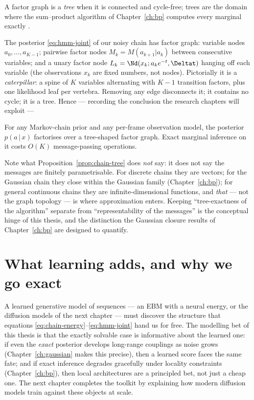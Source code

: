 A factor graph is a \emph{tree} when it is connected and cycle-free; trees
are the domain where the sum--product algorithm of Chapter~\ref{ch:bp}
computes every marginal exactly \citep{pearl1988probabilistic,
mezard2009information, bishop2006pattern}.

The posterior \eqref{eq:hmm-joint} of our noisy chain has factor graph:
variable nodes $a_0, \dots, a_{K-1}$; pairwise factor nodes
$M_k = M(a_{k+1}|a_k)$ between consecutive variables; and a unary factor
node $L_k = \Nd(x_k; a_k e^{-t}, \Deltat)$ hanging off each variable (the
observations $x_k$ are fixed numbers, not nodes). Pictorially it is a
\emph{caterpillar}: a spine of $K$ variables alternating with $K-1$
transition factors, plus one likelihood leaf per vertebra. Removing any edge
disconnects it; it contains no cycle; it is a tree. Hence --- recording the
conclusion the research chapters will exploit ---

\begin{proposition}\label{prop:chain-tree}
For any Markov-chain prior and any per-frame observation model, the
posterior $p(a \,|\, x)$ factorises over a tree-shaped factor graph.
Exact marginal inference on it costs $O(K)$ message-passing operations.
\end{proposition}

Note what Proposition~\ref{prop:chain-tree} does \emph{not} say: it does not
say the messages are finitely parametrisable. For discrete chains they are
vectors; for the Gaussian chain they close within the Gaussian family
(Chapter~\ref{ch:bp}); for general continuous chains they are
infinite-dimensional functions, and \emph{that} --- not the graph topology
--- is where approximation enters. Keeping ``tree-exactness of the
algorithm'' separate from ``representability of the messages'' is the
conceptual hinge of this thesis, and the distinction the Gaussian closure
results of Chapter~\ref{ch:bp} are designed to quantify.

\section{What learning adds, and why we go exact}\label{sec:ebm-learning}

A learned generative model of sequences --- an EBM with a neural energy, or
the diffusion models of the next chapter --- must discover the structure
that equations \eqref{eq:chain-energy}--\eqref{eq:hmm-joint} hand us for
free. The modelling bet of this thesis is that the exactly solvable case is
informative about the learned one: if even the \emph{exact} posterior
develops long-range couplings as noise grows (Chapter~\ref{ch:gaussian}
makes this precise), then a learned score faces the same fate; and if exact
inference degrades gracefully under locality constraints
(Chapter~\ref{ch:bp}), then local architectures are a principled bet, not
just a cheap one. The next chapter completes the toolkit by explaining how
modern diffusion models train against these objects at scale.
